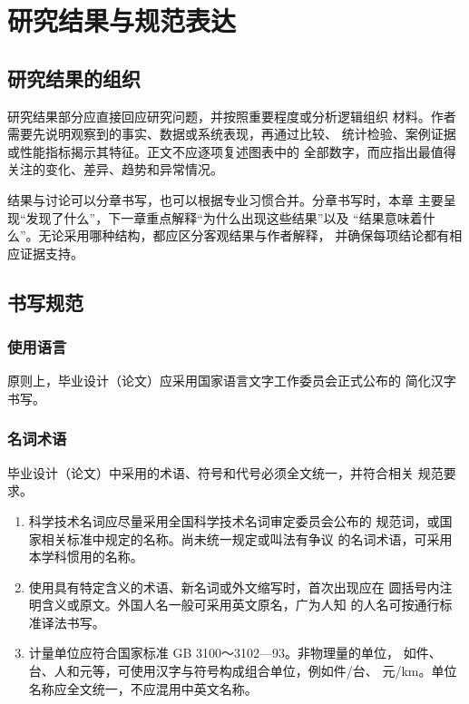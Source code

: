 \chapter{研究结果与规范表达}

\section{研究结果的组织}

研究结果部分应直接回应研究问题，并按照重要程度或分析逻辑组织
材料。作者需要先说明观察到的事实、数据或系统表现，再通过比较、
统计检验、案例证据或性能指标揭示其特征。正文不应逐项复述图表中的
全部数字，而应指出最值得关注的变化、差异、趋势和异常情况。

结果与讨论可以分章书写，也可以根据专业习惯合并。分章书写时，本章
主要呈现“发现了什么”，下一章重点解释“为什么出现这些结果”以及
“结果意味着什么”。无论采用哪种结构，都应区分客观结果与作者解释，
并确保每项结论都有相应证据支持。

\section{书写规范}

\subsection{使用语言}

原则上，毕业设计（论文）应采用国家语言文字工作委员会正式公布的
简化汉字书写。

\subsection{名词术语}

毕业设计（论文）中采用的术语、符号和代号必须全文统一，并符合相关
规范要求。

\begin{enumerate}
  \item 科学技术名词应尽量采用全国科学技术名词审定委员会公布的
    规范词，或国家相关标准中规定的名称。尚未统一规定或叫法有争议
    的名词术语，可采用本学科惯用的名称。
  \item 使用具有特定含义的术语、新名词或外文缩写时，首次出现应在
    圆括号内注明含义或原文。外国人名一般可采用英文原名，广为人知
    的人名可按通行标准译法书写。
  \item 计量单位应符合国家标准 GB 3100～3102—93。非物理量的单位，
    如件、台、人和元等，可使用汉字与符号构成组合单位，例如件/台、
    元/km。单位名称应全文统一，不应混用中英文名称。
\end{enumerate}

